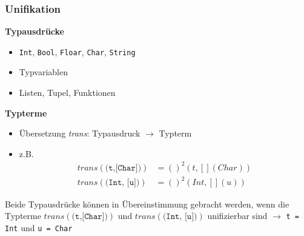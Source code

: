 \documentclass{beamer}
\begin{document}
\begin{frame}[fragile] \frametitle{Unifikation}
	\textbf{Typausdrücke}
	\begin{itemize}
		\item \texttt{Int}, \texttt{Bool}, \texttt{Floar}, \texttt{Char}, \texttt{String}
		\item Typvariablen
		\item Listen, Tupel, Funktionen
	\end{itemize}

	\textbf{Typterme}
	\begin{itemize}
		\item Übersetzung \textit{trans}: Typausdruck $\to$ Typterm
		\item z.B.
		\begin{equation*}
			\begin{aligned}
				trans(\texttt{(t,[Char])}) &= ()^2(t, [](Char)) \\
				trans(\texttt{(Int, [u])}) &= ()^2(Int, [](u))
			\end{aligned}
		\end{equation*}
	\end{itemize}

	\pause
	
	Beide Typausdrücke können in Übereinstimmung gebracht werden, wenn die Typterme $trans(\texttt{(t,[Char])})$ und $trans(\texttt{(Int, [u])})$ unifizierbar sind
	\pause
	$\to$ \texttt{t = Int} und \texttt{u = Char}
\end{frame}
\end{document}

